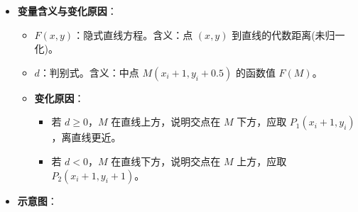 \documentclass[UTF8]{ctexart}
\begin{document}
\begin{itemize}
\begin{center}
\begin{tabular}{|c|c|c|c|c|}
            \hline
        \end{tabular}
        \end{center}
    \item \textbf{变量含义与变化原因}：
    \begin{itemize}
        \item $F(x,y)$：隐式直线方程。含义：点 $(x,y)$ 到直线的代数距离(未归一化)。
        \item $d$：判别式。含义：中点 $M(x_i+1, y_i+0.5)$ 的函数值 $F(M)$。
        \item \textbf{变化原因}：
            \begin{itemize}
                \item 若 $d \ge 0$，$M$ 在直线上方，说明交点在 $M$ 下方，应取 $P_1(x_i+1, y_i)$，离直线更近。
                \item 若 $d < 0$，$M$ 在直线下方，说明交点在 $M$ 上方，应取 $P_2(x_i+1, y_i+1)$。
            \end{itemize}
    \end{itemize}
    \item \textbf{示意图}：
    \begin{center}
    \end{center}
\end{itemize}
\end{document}
